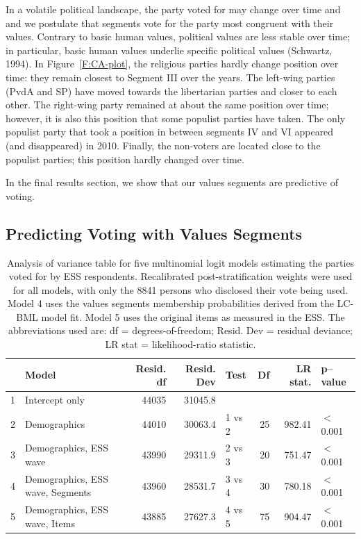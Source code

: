 \documentclass[12pt,letter]{article}\usepackage[]{graphicx}\usepackage[]{xcolor}
\begin{document}
In a volatile political landscape, the party voted for may change over time and and we postulate that segments vote for the party most congruent with their values. Contrary to basic human values, political values are less stable over time; in particular, basic human values underlie specific political values (Schwartz, 1994). In Figure~\ref{F:CA-plot}, the religious parties hardly change position over time: they remain closest to Segment III over the years. The left-wing parties (PvdA and SP) have moved towards the libertarian parties and closer to each other. The right-wing party remained at about the same position over time; however, it is also this position that some populist parties have taken. The only populist party that took a position in between segments IV and VI appeared (and disappeared) in 2010. Finally, the non-voters are located close to the populist parties; this position hardly changed over time. 


In the final results section, we show that our values segments are predictive of voting.

\subsection*{Predicting Voting with Values Segments}



\begin{table}[ht]
\centering
\begingroup\footnotesize
\begin{tabular}{rlrrlrrl}
  \toprule
 & Model & Resid. df & Resid. Dev & Test &    Df & LR stat. & p--value \\ 
  \midrule
1 & Intercept only & 44035 & 31045.8 &  &  &  &  \\ 
  2 & Demographics & 44010 & 30063.4 & 1 vs 2 & 25 & 982.41 & $<$0.001 \\ 
  3 & Demographics, ESS wave & 43990 & 29311.9 & 2 vs 3 & 20 & 751.47 & $<$0.001 \\ 
  4 & Demographics, ESS wave, Segments & 43960 & 28531.7 & 3 vs 4 & 30 & 780.18 & $<$0.001 \\ 
  5 & Demographics, ESS wave, Items & 43885 & 27627.3 & 4 vs 5 & 75 & 904.47 & $<$0.001 \\ 
   \bottomrule
\end{tabular}
\endgroup
\caption{Analysis of variance table for five multinomial logit models estimating the parties voted for by ESS respondents. Recalibrated post-stratification weights were used for all models, with only the 8841 persons who disclosed their vote being used. Model 4 uses the values segments membership probabilities derived from the LC-BML model fit. Model 5 uses the original items as measured in the ESS. The abbreviations used are: df = degrees-of-freedom; Resid. Dev = residual deviance; LR stat = likelihood-ratio statistic.} 
\label{T:anova-mlogit}
\end{table}
\end{document}
